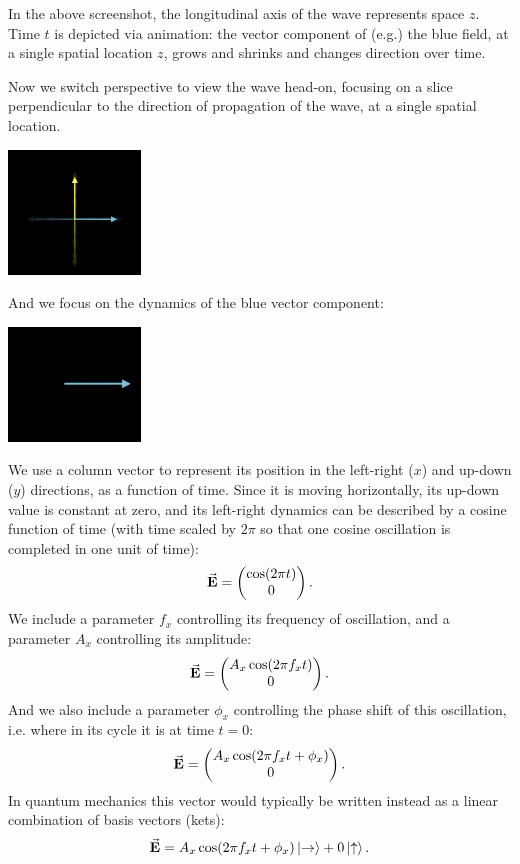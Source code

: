 In the above screenshot, the longitudinal axis of the wave represents space $z$. Time $t$ is
depicted via animation: the vector component of (e.g.) the blue field, at a single spatial location
$z$, grows and shrinks and changes direction over time.

Now we switch perspective to view the wave head-on, focusing on a slice perpendicular to the
direction of propagation of the wave, at a single spatial location.


\includegraphics[width=100pt]{img/quantum-waves-2.png}

And we focus on the dynamics of the blue vector component:

\includegraphics[width=100pt]{img/quantum-waves-3.png}

We use a column vector to represent its position in the left-right ($x$) and up-down ($y$)
directions, as a function of time. Since it is moving horizontally, its up-down value is constant at
zero, and its left-right dynamics can be described by a cosine function of time (with time scaled by
$2\pi$ so that one cosine oscillation is completed in one unit of time):
\begin{align*}
  \va E = \begin{pmatrix}\cos(2\pi t)\\0\end{pmatrix}.
\end{align*}
We include a parameter $f_x$ controlling its frequency of oscillation, and a parameter $A_x$
controlling its amplitude:
\begin{align*}
  \va E = \begin{pmatrix}A_x\cos(2\pi f_xt)\\0\end{pmatrix}.
\end{align*}
And we also include a parameter $\phi_x$ controlling the phase shift of this oscillation, i.e. where
in its cycle it is at time $t=0$:
\begin{align*}
  \va E = \begin{pmatrix}A_x\cos(2\pi f_xt + \phi_x)\\0\end{pmatrix}.
\end{align*}
In quantum mechanics this vector would typically be written instead as a linear combination of basis
vectors (kets):
\begin{align*}
  \va E = A_x \cos(2\pi f_x t + \phi_x) \ket{\rightarrow} + 0\ket{\uparrow}.
\end{align*}

